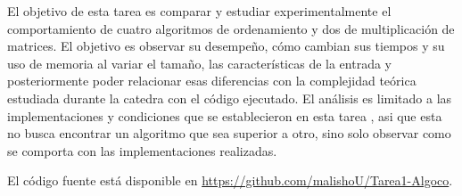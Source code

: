 El objetivo de esta tarea es comparar y estudiar experimentalmente el comportamiento de 
cuatro algoritmos de ordenamiento y dos de multiplicación de matrices. El objetivo es observar 
su desempeño, cómo cambian sus tiempos y su uso de memoria al variar el tamaño, las características de la entrada
y posteriormente poder relacionar esas diferencias con la complejidad teórica estudiada durante la catedra con el código ejecutado.
El análisis es limitado a las implementaciones y condiciones que se establecieron en esta tarea 
\cite{material_tarea1}, asi que esta no busca encontrar un algoritmo que sea superior a otro,
sino solo observar como se comporta con las implementaciones realizadas.

El código fuente está disponible en \url{https://github.com/malishoU/Tarea1-Algoco}.

